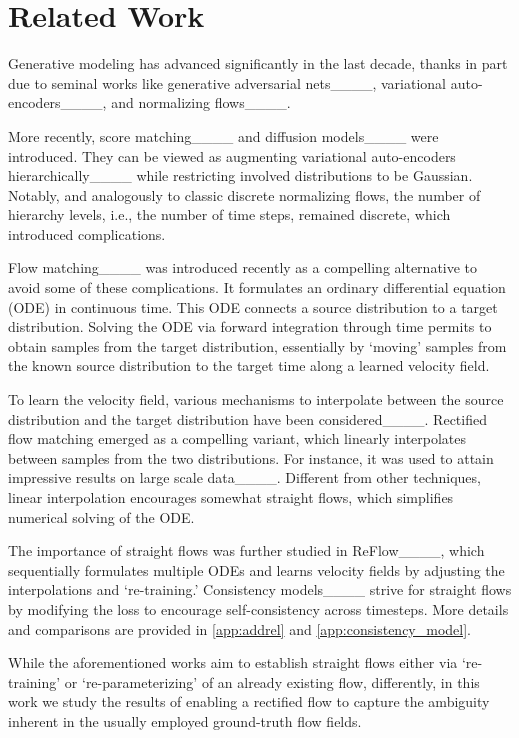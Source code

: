 \section{Related Work}
\label{sec:rel}

Generative modeling has advanced significantly in the last decade, thanks in part due to seminal works like generative adversarial nets____, variational auto-encoders____, and normalizing flows____.

More recently, score matching____ and diffusion models____ were introduced. They can be viewed as augmenting variational auto-encoders hierarchically____ while restricting involved distributions to be Gaussian. Notably, and analogously to classic discrete normalizing flows, the number of hierarchy levels, i.e., the number of time steps, remained discrete, which introduced complications.

Flow matching____ was introduced recently as a compelling alternative to avoid some of these complications. It formulates an ordinary differential equation (ODE) in continuous time. This ODE connects a source distribution to a target distribution. Solving the ODE via forward integration through time permits to obtain samples from the target distribution, essentially by `moving' samples from the known source distribution to the target time along a learned velocity field.

To learn the velocity field, various mechanisms to interpolate between the source distribution and the target distribution have been considered____. Rectified flow matching emerged as a compelling variant, which linearly interpolates between samples from the two distributions. For instance, it was used to attain impressive results on large scale data____. Different from other techniques, linear interpolation encourages somewhat straight flows, which simplifies numerical solving of the ODE.

The importance of straight flows was further studied in ReFlow____, which sequentially formulates multiple ODEs and learns velocity fields by adjusting the interpolations and `re-training.'
Consistency models____ strive for straight flows by modifying the loss to encourage self-consistency across timesteps. More details and comparisons are provided in \cref{app:addrel} and \ref{app:consistency_model}.


While the aforementioned works aim to establish straight flows either via `re-training' or `re-parameterizing' of an already existing flow, differently, in this work we study the results of enabling a rectified flow to capture the ambiguity inherent in the usually employed ground-truth flow fields. %

